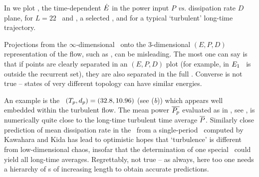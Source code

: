 In  we plot , the time-dependent
$\dot{E}$ in the power input $P$ {\em vs.}
dissipation rate $D$ plane, for $L=22$ \eqva\ and \reqva,
a selected \rpo, and for a typical `turbulent' long-time
trajectory.

Projections from the $\infty$-dimensional \statesp\ onto the 3-dimensional
$(E,P,D)$ representation of the flow, such as
, can be misleading.
The most one can say is that if points are clearly separated in an
$(E,P,D)$ plot (for example, in 
$E_{1}$ \eqv\ is outside the recurrent set), they are also separated
in the full \statesp.  Converse is not true -- states of
very different topology can have similar energies.

An example is
the \rpo\ $({T_{p}},d_p) = (32.8,10.96)$
(see (\textit{b})) which appears well embedded
within the turbulent flow. The mean power $\overline{P_p}$ evaluated
as in , see ,
is numerically quite close to the long-time
turbulent time average $\overline{P}$.
Similarly close prediction of mean dissipation rate in the
\pCf\ from a single-period \po\ computed by
Kawahara and Kida has lead to
optimistic hopes that `turbulence' is different from
low-dimensional chaos, insofar that the determination of one special
\po\ could yield all long-time averages.
Regrettably, not true -- as always, here too one needs a hierarchy
of \po s of increasing length to obtain accurate
predictions.

